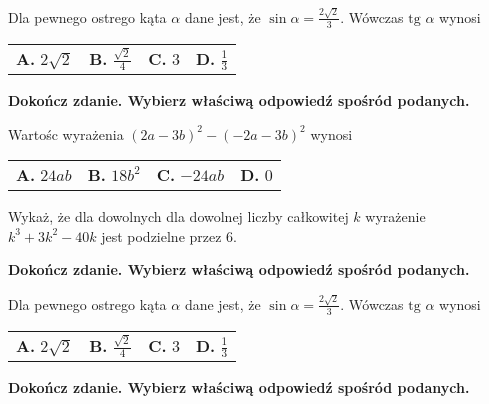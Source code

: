 \documentclass[12pt,a4paper]{article}
\theoremstyle{break}
\begin{document}
	Dla pewnego ostrego kąta $\alpha$ dane jest, że $\sin\alpha = \frac{2\sqrt{2}}{3}$. Wówczas $\text{tg }\alpha$ wynosi
	
	\vspace{0.5cm}
	\begin{tabular}{p{3.5cm} p{3.5cm} p{3.5cm} p{3.5cm}}
		\textbf{A. }$2\sqrt{2}$&
		\textbf{B. }$\frac{\sqrt{2}}{4}$&
		\textbf{C. }$3$&
		\textbf{D. }$\frac{1}{3}$\\
	\end{tabular}

	
	\begin{zad}[0-1]
		\textbf{Dokończ zdanie. Wybierz właściwą odpowiedź spośród podanych.}
	\end{zad} 
	
	Wartośc wyrażenia $(2a-3b)^2-(-2a-3b)^2$ wynosi
	
	\vspace{0.5cm}
	\begin{tabular}{p{3.5cm} p{3.5cm} p{3.5cm} p{3.5cm}}
		\textbf{A. }$24ab$&
		\textbf{B. }$18b^2$&
		\textbf{C. }$-24ab$&
		\textbf{D. }$0$\\
	\end{tabular}


	\begin{zad}[0-2]
		Wykaż, że dla dowolnych dla dowolnej liczby całkowitej $k$ wyrażenie $k^3+3k^2-40k$ jest podzielne przez 6.
	\end{zad} 

	
	\begin{zad}[0-1]
		\textbf{Dokończ zdanie. Wybierz właściwą odpowiedź spośród podanych.}
	\end{zad} 
	
	Dla pewnego ostrego kąta $\alpha$ dane jest, że $\sin\alpha = \frac{2\sqrt{2}}{3}$. Wówczas $\text{tg }\alpha$ wynosi
	
	\vspace{0.5cm}
	\begin{tabular}{p{3.5cm} p{3.5cm} p{3.5cm} p{3.5cm}}
		\textbf{A. }$2\sqrt{2}$&
		\textbf{B. }$\frac{\sqrt{2}}{4}$&
		\textbf{C. }$3$&
		\textbf{D. }$\frac{1}{3}$\\
	\end{tabular}

	\newpage
	\begin{zad}[0-1]
		\textbf{Dokończ zdanie. Wybierz właściwą odpowiedź spośród podanych.}
	\end{zad} 
	
\end{document}
